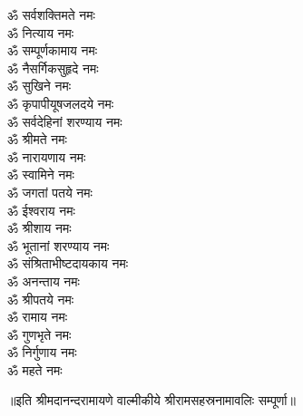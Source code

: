\begin{multicols}{2}
\begin{flushleft}
ॐ सर्वशक्तिमते नमः\\
ॐ नित्याय नमः\\
ॐ सम्पूर्णकामाय नमः\hfill{}\\
ॐ नैसर्गिकसुहृदे नमः\\
ॐ सुखिने नमः\\
ॐ कृपापीयूषजलदये नमः\\
ॐ सर्वदेहिनां शरण्याय नमः\\
ॐ श्रीमते नमः\\
ॐ नारायणाय नमः\\
ॐ स्वामिने नमः\\
ॐ जगतां पतये नमः\\
ॐ ईश्वराय नमः\\
ॐ श्रीशाय नमः\hfill{}\\
ॐ भूतानां शरण्याय नमः\\
ॐ संश्रिताभीष्टदायकाय नमः\\
ॐ अनन्ताय नमः\\
ॐ श्रीपतये नमः\\
ॐ रामाय नमः\\
ॐ गुणभृते नमः\\
ॐ निर्गुणाय नमः\\
ॐ महते नमः\\
\end{flushleft}
\end{multicols}
\centerline{॥इति श्रीमदानन्दरामायणे वाल्मीकीये श्रीरामसहस्रनामावलिः सम्पूर्णा॥}
